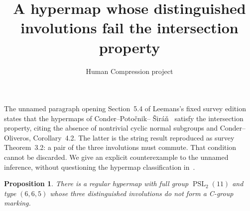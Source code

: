 \documentclass[11pt,a4paper]{article}
\title{A hypermap whose distinguished involutions fail the intersection property}
\author{Human Compression project}\date{}
\newtheorem{proposition}{Proposition}
\begin{document}
\maketitle
The unnamed paragraph opening Section~5.4 of Leemans's fixed survey
edition~\cite{survey} states that the hypermaps of Conder--Poto\v cnik--
\v Sir\'a\v n~\cite{CPS} satisfy the intersection property, citing the
absence of nontrivial cyclic normal subgroups and Conder--Oliveros,
Corollary~4.2. The latter is the string result reproduced as survey
Theorem~3.2: a pair of the three involutions must commute. That condition
cannot be discarded. We give an explicit counterexample to the unnamed
inference, without questioning the hypermap classification in~\cite{CPS}.

\begin{proposition}
There is a regular hypermap with full group $\operatorname{PSL}_2(11)$
and type $(6,6,5)$ whose three distinguished involutions do not form a
C-group marking.
\end{proposition}
\end{document}
